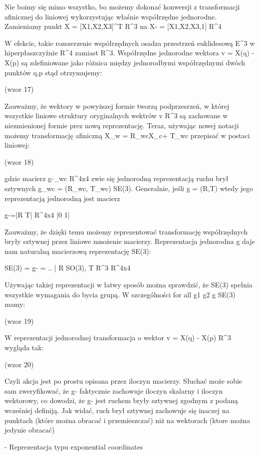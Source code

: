 Nie boimy się mimo wszystko, bo możemy dokonać konwersji z transformacji afinicznej do liniowej wykorzystując właśnie współrzędne jednorodne. Zamieniamy punkt X = [X1,X2,X3]^T \in R^3 na X- = [X1,X2,X3,1] \in R^4

W efekcie, takie rozszerzenie współrzędnych osadza przestrzeń euklidesową  E^3 w hiperpłaszczyźnie R^4 zamiast R^3. Współrzędne jednorodne wektora v = X(q) - X(p) są zdefiniowane jako różnica między jednorodbymi współrzędnymi dwóch punktów q,p stąd otrzymujemy:

(wzor 17)

Zauważmy, że wektory w powyższej formie tworzą podprzesrzeń, w której wszystkie liniowe struktury oryginalnych wektrów v \in R^3 są zachowane w niezmienionej formie prez nową reprezentację. Teraz, używając nowej notacji możemy transformację afiniczną X_w = R_wcX_c+ T_wc przepisać w postaci liniowej:

(wzor 18)

gdzie macierz g-_wc \in R^4x4 zwie się jednorodną reprezentacją ruchu brył sztywnych g_wc = (R_wc, T_wc) \in SE(3). Generalnie, jeśli g = (R,T) wtedy jego reprezentacją jednorodną jest macierz 

g-=|R T|  \in R^4x4
   |0 1|

Zauważmy, że dzięki temu możemy reprezentować transformację współrzędnych bryły sztywnej przez liniowe mnożenie macierzy. Reprezentacja jednorodna g daje nam naturalną macierzową reprezentację SE(3):

SE(3) = { g- = .. | R \in SO(3), T \in R^3} \podzbior R^4x4

Używając takiej reprezentacji w łatwy sposób można sprawdzić, że SE(3) spełnia wszystkie wymagania do bycia grupą. W szczególności for all g1 g2 g \in SE(3) mamy:

(wzor 19)

W reprezentacji jednorodnej transformacja o wektor v = X(q) - X(p) \in R^3 wygląda tak:

(wzor 20)

Czyli akcja jest po prostu opisana przez iloczyn macierzy. Słuchać może sobie sam zweryfikować, że g- faktycznie zachowuje iloczyn skalarny i iloczyn wektorowy, co dowodzi, że g- jest ruchem bryły sztywnej zgodnym z podaną wcześniej definiją. Jak widać, ruch brył sztywnej zachowuje się inaczej na punktach (które można obracać i przemieszczać) niż na wektorach (ktore można jedynie obracać)

- Reprezentacja typu exponential coordinates

